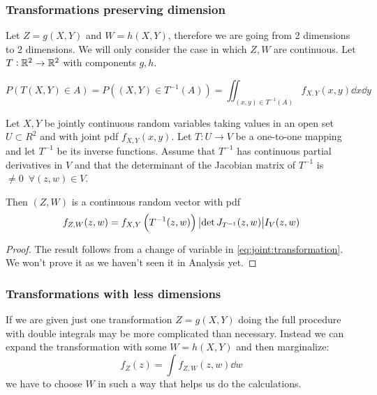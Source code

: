 \documentclass[12pt]{extarticle}
\begin{document}
\subsubsection{Transformations preserving dimension}

Let $Z = g(X, Y)$ and $W = h(X, Y)$, therefore we are going from 2 dimensions to 2 dimensions.
We will only consider the case in which $Z, W$ are continuous.
Let $T: \mathbb{R}^2 \to \mathbb{R}^2$ with components $g, h$.

\begin{equation}
    \label{eq:joint:transformation}
    P\left(T(X, Y) \in A\right) = P \left((X, Y) \in T^{-1}(A)\right) = \iint_{(x,y) \in T^{-1}(A)} f_{X, Y}(x, y) \dd{x} \dd{y}
\end{equation}

\begin{theorem}
    Let $X, Y$ be jointly continuous random variables taking values in an open set $U \subset R^2$ and with joint pdf $f_{X, Y}(x, y)$.
    Let $T:U \to V$ be a one-to-one mapping and let $T^{-1}$ be its inverse functions.
    Assume that $T^{-1}$ has continuous partial derivatives in $V$ and that the determinant of the Jacobian matrix of $T^{-1}$ is $\ne 0 \enspace \forall (z, w) \in V$.

    Then $(Z, W)$ is a continuous random vector with pdf
    \begin{equation}
        f_{Z, W}(z, w) = f_{X, Y}\left(T^{-1}(z, w)\right) \abs{\det J_{T^{-1}}(z, w)} I_V(z, w)
    \end{equation}
\end{theorem}

\begin{proof}
    The result follows from a change of variable in \autoref{eq:joint:transformation}.
    We won't prove it as we haven't seen it in Analysis yet.
\end{proof}

\subsubsection{Transformations with less dimensions}

If we are given just one transformation $Z = g(X, Y)$ doing the full procedure with double integrals may be more complicated than necessary.
Instead we can expand the transformation with some $W = h(X, Y)$ and then marginalize:
\begin{equation}
    f_Z(z) = \int f_{Z, W}(z, w) \dd{w}
\end{equation}
we have to choose $W$ in such a way that helps us do the calculations.
\end{document}
